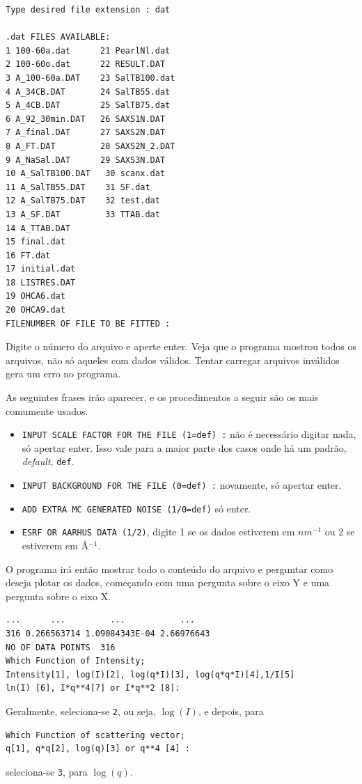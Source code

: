\begin{apendicesenv}
\begin{verbatim}
Type desired file extension : dat

.dat FILES AVAILABLE:
1 100-60a.dat      21 PearlNl.dat
2 100-60o.dat      22 RESULT.DAT
3 A_100-60a.DAT    23 SalTB100.dat
4 A_34CB.DAT       24 SalTB55.dat
5 A_4CB.DAT        25 SalTB75.dat
6 A_92_30min.DAT   26 SAXS1N.DAT
7 A_final.DAT      27 SAXS2N.DAT
8 A_FT.DAT         28 SAXS2N_2.DAT
9 A_NaSal.DAT      29 SAXS3N.DAT
10 A_SalTB100.DAT   30 scanx.dat
11 A_SalTB55.DAT    31 SF.dat
12 A_SalTB75.DAT    32 test.dat
13 A_SF.DAT         33 TTAB.dat
14 A_TTAB.DAT
15 final.dat
16 FT.dat
17 initial.dat
18 LISTRES.DAT
19 OHCA6.dat
20 OHCA9.dat
FILENUMBER OF FILE TO BE FITTED :
\end{verbatim}

Digite o número do arquivo e aperte enter. Veja que o programa mostrou todos os arquivos, não só aqueles com dados válidos. Tentar carregar arquivos inválidos gera um erro no programa.

As seguintes frases irão aparecer, e os procedimentos a seguir são os mais comumente usados.

\begin{itemize}
	\item \texttt{INPUT SCALE FACTOR FOR THE FILE (1=def) :} não é necessário digitar nada, só apertar enter. Isso vale para a maior parte dos casos onde há um padrão, \emph{default}, \texttt{def}.
	\item \texttt{INPUT BACKGROUND FOR THE FILE (0=def) :} novamente, só apertar enter.
	\item \texttt{ADD EXTRA MC GENERATED NOISE (1/0=def)} só enter.
	\item \texttt{ESRF OR AARHUS DATA (1/2)}, digite 1 se os dados estiverem em \(nm^{-1}\) ou 2 se estiverem em \AA\(^{-1}\).
\end{itemize}

O programa irá então mostrar todo o conteúdo do arquivo e perguntar como deseja plotar os dados, começando com uma pergunta sobre o eixo Y e uma pergunta sobre o eixo X.

\begin{verbatim}
...      ...         ...           ...
316 0.266563714 1.09084343E-04 2.66976643
NO OF DATA POINTS  316
Which Function of Intensity;
Intensity[1], log(I)[2], log(q*I)[3], log(q*q*I)[4],1/I[5]
ln(I) [6], I*q**4[7] or I*q**2 [8]:
\end{verbatim}

Geralmente, seleciona-se \texttt{2}, ou seja, \(\log(I)\), e depois, para 
\begin{verbatim}Which Function of scattering vector;
q[1], q*q[2], log(q)[3] or q**4 [4] :\end{verbatim} seleciona-se \texttt{3}, para \(\log(q)\).


\end{apendicesenv}
